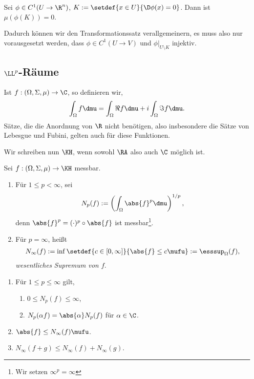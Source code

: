 \begin{bem}
\label{bem:3.61}
\begin{propn}
Sei $\phi\in C^1(U\to\R^n)$, $K:=\setdef{x\in U}{\D\phi(x)=0}$. Dann ist
$\mu(\phi(K)) = 0$.\fishhere
\end{propn}
Dadurch können wir den Transformationssatz verallgemeinern, es muss also nur
vorausgesetzt werden, dass $\phi\in C^1(U\to V)$ und
$\phi\big|_{U\setminus K}$ injektiv.\maphere
\end{bem}

\subsection{$\LL^p$-Räume}
\begin{bem}[Vorbemerkung.]
\label{bem:3.62}
Ist $f:(\Omega,\Sigma,\mu)\to\C$, so definieren wir,
\begin{align*}
\int_\Omega f\dmu = \int_\Omega \Re f\dmu + i\int_\Omega \Im f\dmu.
\end{align*}
Sätze, die die Anordnung von $\R$ nicht benötigen, also insbesondere die Sätze
von Lebesgue und Fubini, gelten auch für diese Funktionen.

Wir schreiben nun $\KH$, wenn sowohl $\RA$ also auch $\C$ möglich ist.\maphere 
\end{bem}

\begin{defn}
\label{defn:3.63}
Sei $f:(\Omega,\Sigma,\mu)\to\KH$ messbar.
\begin{enumerate}[label=\arabic{*}.)]
  \item Für $1\le p<\infty$, sei
\begin{align*}
N_p(f) := \left(\int_\Omega \abs{f}^p \dmu\right)^{1/p},
\end{align*}
denn $\abs{f}^p = (\cdot)^p\circ\abs{f}$ ist messbar\footnote{Wir setzen
$\infty^p=\infty$}.
\item Für $p=\infty$, heißt
\begin{align*}
N_\infty(f) := \inf\setdef{c\in[0,\infty]}{\abs{f}\le c \mufu}
:= \esssup_\Omega(f),
\end{align*}
\emph{wesentliches Supremum von $f$}.\fishhere
\end{enumerate}
\end{defn}

\begin{cor}
\label{prop:3.64}
\begin{enumerate}[label=\arabic{*}.)]
  \item Für $1\le p\le\infty$ gilt,
  \begin{enumerate}[label=(\roman{*})]
    \item $0\le N_p(f) \le \infty$,
    \item $N_p(\alpha f) = \abs{\alpha}N_p(f)$ für $\alpha\in\C$.
  \end{enumerate}
\item $\abs{f}\le N_\infty(f) \mufu$.
\item $N_\infty(f+g) \le N_\infty(f)+N_\infty(g)$.\fishhere
  \end{enumerate}
\end{cor}

